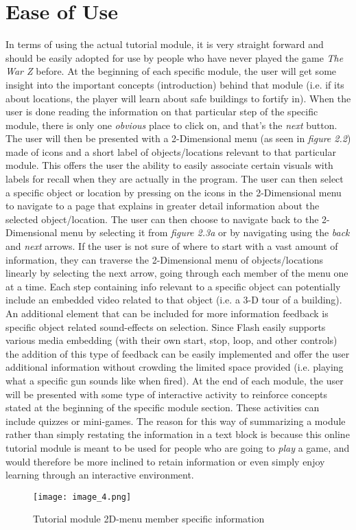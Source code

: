 \documentclass[12pt]{report}
\begin{document}
\section{Ease of Use}
In terms of using the actual tutorial module, it is very straight forward and should be easily adopted for use by people who have never played the game \textit{The War Z} before. At the beginning of each specific module, the user will get some insight into the important concepts (introduction) behind that module (i.e. if its about locations, the player will learn about safe buildings to fortify in). When the user is done reading the information on that particular step of the specific module, there is only one \textit{obvious} place to click on, and that's the \textit{next} button. The user will then be presented with a 2-Dimensional menu (as seen in \textit{figure 2.2}) made of icons and a short label of objects/locations relevant to that particular module. This offers the user the ability to easily associate certain visuals with labels for recall when they are actually in the program. The user can then select a specific object or location by pressing on the icons in the 2-Dimensional menu to navigate to a page that explains in greater detail information about the selected object/location. The user can then choose to navigate back to the 2-Dimensional menu by selecting it from \textit{figure 2.3a} or by navigating using the \textit{back} and \textit{next} arrows. If the user is not sure of where to start with a vast amount of information, they can traverse the 2-Dimensional menu of objects/locations linearly by selecting the next arrow, going through each member of the menu one at a time. Each step containing info relevant to a specific object can potentially include an embedded video related to that object (i.e. a 3-D tour of a building). An additional element that can be included for more information feedback is specific object related sound-effects on selection. Since Flash easily supports various media embedding (with their own start, stop, loop, and other controls) the addition of this type of feedback can be easily implemented and offer the user additional information without crowding the limited space provided (i.e. playing what a specific gun sounds like when fired). At the end of each module, the user will be presented with some type of interactive activity to reinforce concepts stated at the beginning of the specific module section. These activities can include quizzes or mini-games. The reason for this way of summarizing a module rather than simply restating the information in a text block is because this online tutorial module is meant to be used for people who are going to \textit{play} a game, and would therefore be more inclined to retain information or even simply enjoy learning through an interactive environment.
\begin{figure}
\begin{center}
\leavevmode
\texttt{[image: image\_4.png]}
\end{center}
\caption{Tutorial module 2D-menu member specific information}
\label{fig:warztut2Dmenu}
\end{figure}
\end{document}
